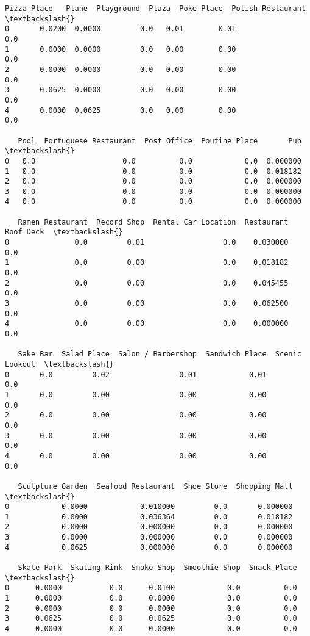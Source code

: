 \documentclass[11pt]{article}
\begin{document}
\begin{tcolorbox}[breakable, size=fbox, boxrule=.5pt, pad at break*=1mm, opacityfill=0]
\begin{Verbatim}[commandchars=\\\{\}]
   Pizza Place   Plane  Playground  Plaza  Poke Place  Polish Restaurant  \textbackslash{}
0       0.0200  0.0000         0.0   0.01        0.01                0.0
1       0.0000  0.0000         0.0   0.00        0.00                0.0
2       0.0000  0.0000         0.0   0.00        0.00                0.0
3       0.0625  0.0000         0.0   0.00        0.00                0.0
4       0.0000  0.0625         0.0   0.00        0.00                0.0

   Pool  Portuguese Restaurant  Post Office  Poutine Place       Pub  \textbackslash{}
0   0.0                    0.0          0.0            0.0  0.000000
1   0.0                    0.0          0.0            0.0  0.018182
2   0.0                    0.0          0.0            0.0  0.000000
3   0.0                    0.0          0.0            0.0  0.000000
4   0.0                    0.0          0.0            0.0  0.000000

   Ramen Restaurant  Record Shop  Rental Car Location  Restaurant  Roof Deck  \textbackslash{}
0               0.0         0.01                  0.0    0.030000        0.0
1               0.0         0.00                  0.0    0.018182        0.0
2               0.0         0.00                  0.0    0.045455        0.0
3               0.0         0.00                  0.0    0.062500        0.0
4               0.0         0.00                  0.0    0.000000        0.0

   Sake Bar  Salad Place  Salon / Barbershop  Sandwich Place  Scenic Lookout  \textbackslash{}
0       0.0         0.02                0.01            0.01             0.0
1       0.0         0.00                0.00            0.00             0.0
2       0.0         0.00                0.00            0.00             0.0
3       0.0         0.00                0.00            0.00             0.0
4       0.0         0.00                0.00            0.00             0.0

   Sculpture Garden  Seafood Restaurant  Shoe Store  Shopping Mall  \textbackslash{}
0            0.0000            0.010000         0.0       0.000000
1            0.0000            0.036364         0.0       0.018182
2            0.0000            0.000000         0.0       0.000000
3            0.0000            0.000000         0.0       0.000000
4            0.0625            0.000000         0.0       0.000000

   Skate Park  Skating Rink  Smoke Shop  Smoothie Shop  Snack Place  \textbackslash{}
0      0.0000           0.0      0.0100            0.0          0.0
1      0.0000           0.0      0.0000            0.0          0.0
2      0.0000           0.0      0.0000            0.0          0.0
3      0.0625           0.0      0.0625            0.0          0.0
4      0.0000           0.0      0.0000            0.0          0.0


\end{Verbatim}
\end{tcolorbox}
\end{document}

